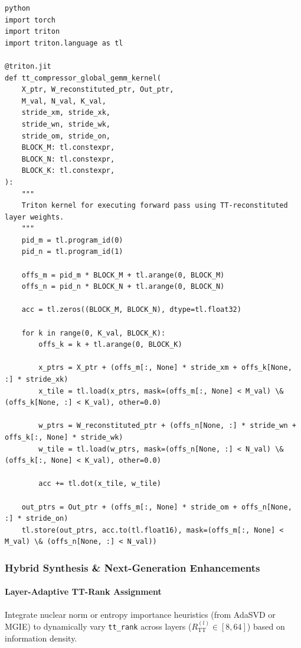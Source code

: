 \vspace{0.5em}
\begin{mdframed}[backgroundcolor=codebg, linecolor=codeframe, linewidth=1pt, roundcorner=4pt, innerleftmargin=2pt, innerrightmargin=5pt, innertopmargin=5pt, innerbottommargin=5pt]
\begin{lstlisting}
python
import torch
import triton
import triton.language as tl

@triton.jit
def tt_compressor_global_gemm_kernel(
    X_ptr, W_reconstituted_ptr, Out_ptr,
    M_val, N_val, K_val,
    stride_xm, stride_xk,
    stride_wn, stride_wk,
    stride_om, stride_on,
    BLOCK_M: tl.constexpr,
    BLOCK_N: tl.constexpr,
    BLOCK_K: tl.constexpr,
):
    """
    Triton kernel for executing forward pass using TT-reconstituted layer weights.
    """
    pid_m = tl.program_id(0)
    pid_n = tl.program_id(1)

    offs_m = pid_m * BLOCK_M + tl.arange(0, BLOCK_M)
    offs_n = pid_n * BLOCK_N + tl.arange(0, BLOCK_N)

    acc = tl.zeros((BLOCK_M, BLOCK_N), dtype=tl.float32)

    for k in range(0, K_val, BLOCK_K):
        offs_k = k + tl.arange(0, BLOCK_K)

        x_ptrs = X_ptr + (offs_m[:, None] * stride_xm + offs_k[None, :] * stride_xk)
        x_tile = tl.load(x_ptrs, mask=(offs_m[:, None] < M_val) \& (offs_k[None, :] < K_val), other=0.0)

        w_ptrs = W_reconstituted_ptr + (offs_n[None, :] * stride_wn + offs_k[:, None] * stride_wk)
        w_tile = tl.load(w_ptrs, mask=(offs_n[None, :] < N_val) \& (offs_k[:, None] < K_val), other=0.0)

        acc += tl.dot(x_tile, w_tile)

    out_ptrs = Out_ptr + (offs_m[:, None] * stride_om + offs_n[None, :] * stride_on)
    tl.store(out_ptrs, acc.to(tl.float16), mask=(offs_m[:, None] < M_val) \& (offs_n[None, :] < N_val))
\end{lstlisting}
\end{mdframed}
\vspace{0.5em}


\subsubsection*{Hybrid Synthesis \& Next-Generation Enhancements}

\paragraph{Layer-Adaptive TT-Rank Assignment}
Integrate nuclear norm or entropy importance heuristics (from AdaSVD or MGIE) to dynamically vary \texttt{tt\_rank} across layers ($R_{\text{TT}}^{(l)} \in [8, 64]$) based on information density.

